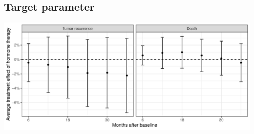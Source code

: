 \documentclass[11pt]{article}
\begin{document}
\subsection{Target parameter}
\label{sec:orgb537d14}

\begin{center}
\includegraphics[width=.9\linewidth]{zelefsky-data-target-par.pdf}
\end{center}
\end{document}
